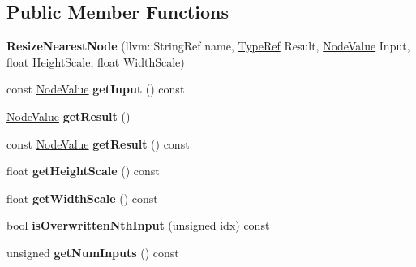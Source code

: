 \subsection*{Public Member Functions}
\begin{DoxyCompactItemize}
\item 
\mbox{\label{classglow_1_1_resize_nearest_node_a4777f8cc2dac5c4a2f502276adc351be}} 
{\bfseries Resize\+Nearest\+Node} (llvm\+::\+String\+Ref name, \hyperlink{structglow_1_1_type}{Type\+Ref} Result, \hyperlink{structglow_1_1_node_value}{Node\+Value} Input, float Height\+Scale, float Width\+Scale)
\item 
\mbox{\label{classglow_1_1_resize_nearest_node_aa512f672979f2c005c7f832b0f31cf6d}} 
const \hyperlink{structglow_1_1_node_value}{Node\+Value} {\bfseries get\+Input} () const
\item 
\mbox{\label{classglow_1_1_resize_nearest_node_a6a5378362b7eab79bf50d13d4e6897d1}} 
\hyperlink{structglow_1_1_node_value}{Node\+Value} {\bfseries get\+Result} ()
\item 
\mbox{\label{classglow_1_1_resize_nearest_node_abd18c4ef2f027dc541ff066cd6c74d07}} 
const \hyperlink{structglow_1_1_node_value}{Node\+Value} {\bfseries get\+Result} () const
\item 
\mbox{\label{classglow_1_1_resize_nearest_node_a47aabe489060ddb9dca2540cb8eb5387}} 
float {\bfseries get\+Height\+Scale} () const
\item 
\mbox{\label{classglow_1_1_resize_nearest_node_a4079df4a61433a2337e835d5f34fa14f}} 
float {\bfseries get\+Width\+Scale} () const
\item 
\mbox{\label{classglow_1_1_resize_nearest_node_aa30d4cc9a56f204d6fb30c4ad0ac9d13}} 
bool {\bfseries is\+Overwritten\+Nth\+Input} (unsigned idx) const
\item 
\mbox{\label{classglow_1_1_resize_nearest_node_acab8bf3d8b18cb4dd84d71bfd69de113}} 
unsigned {\bfseries get\+Num\+Inputs} () const

\end{DoxyCompactItemize}
